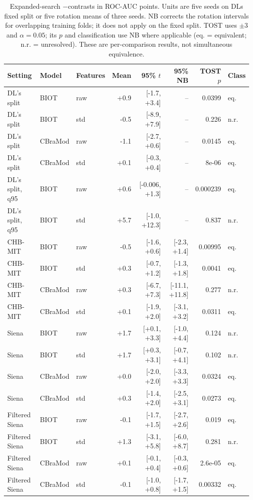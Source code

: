 \begin{table}[!htbp]
\caption{Expanded-search \lastarm$-$\lparm contrasts in ROC-AUC points. Units are five seeds on DL\textquotesingle s fixed split or five rotation means of three seeds. NB corrects the rotation intervals for overlapping training folds; it does not apply on the fixed split. TOST uses $\pm3$ and $\alpha=0.05$; its $p$ and classification use NB where applicable (eq. = equivalent; n.r. = unresolved). These are per-comparison results, not simultaneous equivalence.}
\label{tab:d28}
\centering\footnotesize
\setlength{\tabcolsep}{3pt}
\begin{tabular}{lllrrrrl}
\toprule
Setting & Model & Features & Mean & 95\% $t$ & 95\% NB & TOST $p$ & Class\\
\midrule
DL's split & BIOT & raw & +0.9 & [-1.7, +3.4] & -- & 0.0399 & eq.\\
DL's split & BIOT & std & -0.5 & [-8.9, +7.9] & -- & 0.226 & n.r.\\
DL's split & CBraMod & raw & -1.1 & [-2.7, +0.6] & -- & 0.0145 & eq.\\
DL's split & CBraMod & std & +0.1 & [-0.3, +0.4] & -- & 8e-06 & eq.\\
DL's split, q95 & BIOT & raw & +0.6 & [-0.006, +1.3] & -- & 0.000239 & eq.\\
DL's split, q95 & BIOT & std & +5.7 & [-1.0, +12.3] & -- & 0.837 & n.r.\\
CHB-MIT & BIOT & raw & -0.5 & [-1.6, +0.6] & [-2.3, +1.4] & 0.00995 & eq.\\
CHB-MIT & BIOT & std & +0.3 & [-0.7, +1.2] & [-1.3, +1.8] & 0.0041 & eq.\\
CHB-MIT & CBraMod & raw & +0.3 & [-6.7, +7.3] & [-11.1, +11.8] & 0.277 & n.r.\\
CHB-MIT & CBraMod & std & +0.1 & [-1.9, +2.0] & [-3.1, +3.2] & 0.0311 & eq.\\
Siena & BIOT & raw & +1.7 & [+0.1, +3.3] & [-1.0, +4.4] & 0.124 & n.r.\\
Siena & BIOT & std & +1.7 & [+0.3, +3.1] & [-0.7, +4.1] & 0.102 & n.r.\\
Siena & CBraMod & raw & +0.0 & [-2.0, +2.0] & [-3.3, +3.3] & 0.0324 & eq.\\
Siena & CBraMod & std & +0.3 & [-1.4, +2.0] & [-2.5, +3.1] & 0.0273 & eq.\\
Filtered Siena & BIOT & raw & -0.1 & [-1.7, +1.5] & [-2.7, +2.6] & 0.019 & eq.\\
Filtered Siena & BIOT & std & +1.3 & [-3.1, +5.8] & [-6.0, +8.7] & 0.281 & n.r.\\
Filtered Siena & CBraMod & raw & +0.1 & [-0.1, +0.4] & [-0.3, +0.6] & 2.6e-05 & eq.\\
Filtered Siena & CBraMod & std & -0.1 & [-1.0, +0.8] & [-1.7, +1.5] & 0.00332 & eq.\\
\bottomrule
\end{tabular}
\end{table}

